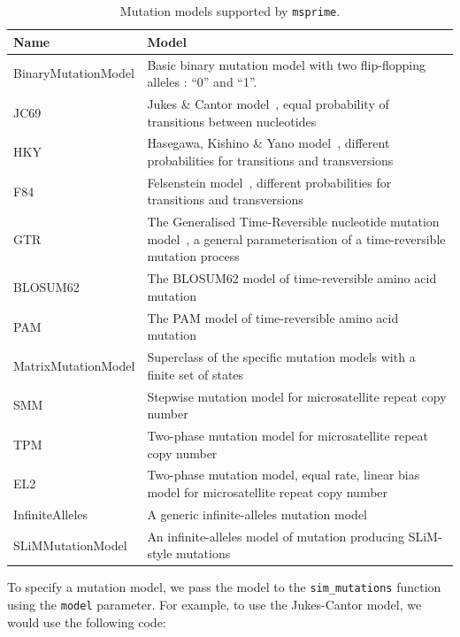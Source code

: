 \documentclass[graybox]{svmult}
\begin{document}
\begin{table}[h]
\centering
\begin{tabular}{|l|p{8cm}|}
\hline
\textbf{Name} & \textbf{Model} \\
\hline
BinaryMutationModel & Basic binary mutation model with two flip-flopping alleles : “0” and “1”. \\
\hline
JC69 & Jukes \& Cantor model~\citep{jukes1969evolution}, equal probability of transitions between nucleotides \\
\hline
HKY & Hasegawa, Kishino \& Yano model~\citep{hasegawa_1985_dating}, different probabilities for transitions and transversions \\
\hline
F84 & Felsenstein model~\citep{felsenstein1996hidden}, different probabilities for transitions and transversions \\
\hline
GTR & The Generalised Time-Reversible nucleotide mutation model~\citep{tavare1986some}, a general parameterisation of a time-reversible mutation process \\
\hline
BLOSUM62 & The BLOSUM62 model of time-reversible amino acid mutation~\citep{henikoff1992amino} \\
\hline
PAM & The PAM model of time-reversible amino acid mutation~\citep{dayhoff1978} \\
\hline
MatrixMutationModel & Superclass of the specific mutation models with a finite set of states \\
\hline
SMM & Stepwise mutation model for microsatellite repeat copy number~\citep{kimura_1978_stepwise} \\
\hline
TPM & Two-phase mutation model for microsatellite repeat copy number~\citep{dirienzo_1994_mutational} \\
\hline
EL2 & Two-phase mutation model, equal rate, linear bias model for microsatellite repeat copy number~\citep{garza_1995_microsatellite} \\
\hline
InfiniteAlleles & A generic infinite-alleles mutation model \\
\hline
SLiMMutationModel & An infinite-alleles model of mutation producing SLiM-style mutations \\
\hline
\end{tabular}
\caption{Mutation models supported by \texttt{msprime}.}
\label{tab:mutation-models}
\end{table}

To specify a mutation model, we pass the model to the \texttt{sim\_mutations} function using the \texttt{model} parameter. For example,
to use the Jukes-Cantor model, we would use the following code:
\end{document}
